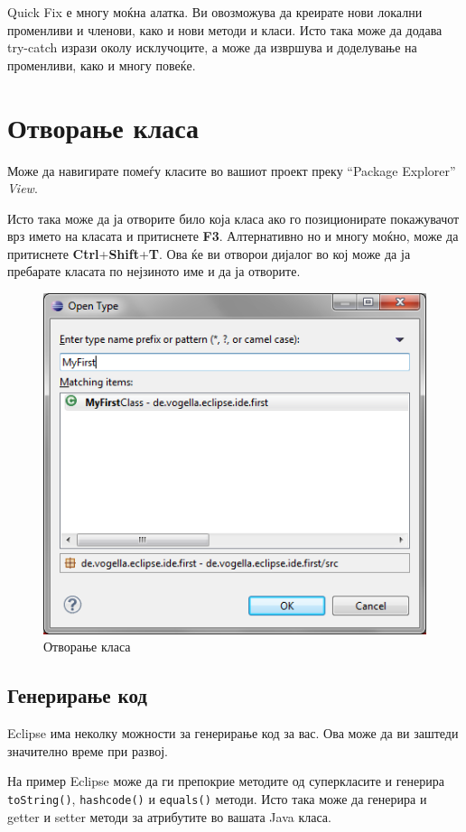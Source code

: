 Quick Fix е многу моќна алатка. Ви овозможува да креирате нови локални
променливи и членови, како и нови методи и класи. Исто така може да додава
try-catch изрази околу исклучоците, а може да извршува и доделување на
променливи, како и многу повеќе.

\section{Отворање класа}

Може да навигирате помеѓу класите во вашиот проект преку ``Package Explorer''
\emph{View}.

Исто така може да ја отворите било која класа ако го позиционирате покажувачот
врз името на класата и притиснете \textbf{F3}. Алтернативно но и
многу моќно, може да притиснете \textbf{Ctrl}+\textbf{Shift}+\textbf{T}. Ова ќе
ви отворои дијалог во кој може да ја пребарате класата по нејзиното име и да ја
отворите.

\begin{figure}
\centering
\includegraphics[scale=.5]{images/open-type}
\caption{Отворање класа}
\end{figure}

\subsection{Генерирање код}

Eclipse има неколку можности за генерирање код за вас. Ова може да ви заштеди
значително време при развој.

На пример Eclipse може да ги препокрие методите од суперкласите и генерира
\texttt{toString()}, \texttt{hashcode()} и \texttt{equals()} методи. Исто така
може да генерира и getter и setter методи за атрибутите во вашата Java класа.

